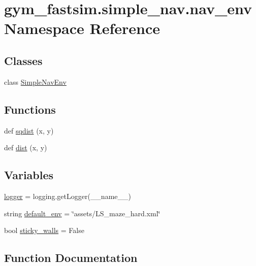 \hypertarget{namespacegym__fastsim_1_1simple__nav_1_1nav__env}{}\section{gym\+\_\+fastsim.\+simple\+\_\+nav.\+nav\+\_\+env Namespace Reference}
\label{namespacegym__fastsim_1_1simple__nav_1_1nav__env}
\subsection*{Classes}
\begin{DoxyCompactItemize}
\item 
class \hyperlink{classgym__fastsim_1_1simple__nav_1_1nav__env_1_1_simple_nav_env}{Simple\+Nav\+Env}
\end{DoxyCompactItemize}
\subsection*{Functions}
\begin{DoxyCompactItemize}
\item 
def \hyperlink{namespacegym__fastsim_1_1simple__nav_1_1nav__env_ac621ca52707b3f551c20c76c5c3c887e}{sqdist} (x, y)
\item 
def \hyperlink{namespacegym__fastsim_1_1simple__nav_1_1nav__env_a41d8b2452c09cd3514659b43db3d9e40}{dist} (x, y)
\end{DoxyCompactItemize}
\subsection*{Variables}
\begin{DoxyCompactItemize}
\item 
\hyperlink{namespacegym__fastsim_1_1simple__nav_1_1nav__env_a8c1f8057ea69598dc1111abc7dfec26a}{logger} = logging.\+get\+Logger(\+\_\+\+\_\+name\+\_\+\+\_\+)
\item 
string \hyperlink{namespacegym__fastsim_1_1simple__nav_1_1nav__env_a5f7b2c19fdd5f4b3846a059ba8d5a74b}{default\+\_\+env} = \char`\"{}assets/L\+S\+\_\+maze\+\_\+hard.\+xml\char`\"{}
\item 
bool \hyperlink{namespacegym__fastsim_1_1simple__nav_1_1nav__env_a8c908c673c55d7c283ae108d1bf8a665}{sticky\+\_\+walls} = False
\end{DoxyCompactItemize}


\subsection{Function Documentation}
